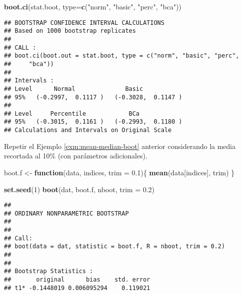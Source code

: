 \documentclass[
]{book}
\newenvironment{Shaded}{\begin{snugshade}}{\end{snugshade}}
\newcommand{\ControlFlowTok}[1]{\textcolor[rgb]{0.13,0.29,0.53}{\textbf{#1}}}
\newcommand{\DataTypeTok}[1]{\textcolor[rgb]{0.13,0.29,0.53}{#1}}
\newcommand{\DecValTok}[1]{\textcolor[rgb]{0.00,0.00,0.81}{#1}}
\newcommand{\FloatTok}[1]{\textcolor[rgb]{0.00,0.00,0.81}{#1}}
\newcommand{\KeywordTok}[1]{\textcolor[rgb]{0.13,0.29,0.53}{\textbf{#1}}}
\newcommand{\NormalTok}[1]{#1}
\newcommand{\StringTok}[1]{\textcolor[rgb]{0.31,0.60,0.02}{#1}}
\theoremstyle{break}
\theoremstyle{definition}
\theoremstyle{definition}
\theoremstyle{definition}
\theoremstyle{remark}
\let\BeginKnitrBlock\begin \let\EndKnitrBlock\end
\begin{document}
\begin{Shaded}
\begin{Highlighting}[]
\KeywordTok{boot.ci}\NormalTok{(stat.boot, }\DataTypeTok{type=}\KeywordTok{c}\NormalTok{(}\StringTok{"norm"}\NormalTok{, }\StringTok{"basic"}\NormalTok{, }\StringTok{"perc"}\NormalTok{, }\StringTok{"bca"}\NormalTok{))}
\end{Highlighting}
\end{Shaded}

\begin{verbatim}
## BOOTSTRAP CONFIDENCE INTERVAL CALCULATIONS
## Based on 1000 bootstrap replicates
## 
## CALL : 
## boot.ci(boot.out = stat.boot, type = c("norm", "basic", "perc", 
##     "bca"))
## 
## Intervals : 
## Level      Normal              Basic         
## 95%   (-0.2997,  0.1117 )   (-0.3028,  0.1147 )  
## 
## Level     Percentile            BCa          
## 95%   (-0.3015,  0.1161 )   (-0.2993,  0.1180 )  
## Calculations and Intervals on Original Scale
\end{verbatim}

\BeginKnitrBlock{exercise}
\protect\hypertarget{exr:mean-trim-boot}{}{\label{exr:mean-trim-boot} }
\EndKnitrBlock{exercise}

Repetir el Ejemplo \ref{exm:mean-median-boot} anterior considerando la media recortada al 10\%
(con parámetros adicionales).

\begin{Shaded}
\begin{Highlighting}[]
\NormalTok{boot.f <-}\StringTok{ }\ControlFlowTok{function}\NormalTok{(data, indices, }\DataTypeTok{trim =} \FloatTok{0.1}\NormalTok{)\{}
  \KeywordTok{mean}\NormalTok{(data[indices], trim)}
\NormalTok{\}}

\KeywordTok{set.seed}\NormalTok{(}\DecValTok{1}\NormalTok{)}
\KeywordTok{boot}\NormalTok{(dat, boot.f, nboot, }\DataTypeTok{trim =} \FloatTok{0.2}\NormalTok{)}
\end{Highlighting}
\end{Shaded}

\begin{verbatim}
## 
## ORDINARY NONPARAMETRIC BOOTSTRAP
## 
## 
## Call:
## boot(data = dat, statistic = boot.f, R = nboot, trim = 0.2)
## 
## 
## Bootstrap Statistics :
##       original      bias    std. error
## t1* -0.1448019 0.006095294    0.119021
\end{verbatim}

\vspace{0.5cm}

\BeginKnitrBlock{exercise}[propuesto]
\protect\hypertarget{exr:rachas-sim}{}{\label{exr:rachas-sim} \iffalse (propuesto) \fi{} }
\EndKnitrBlock{exercise}
\end{document}

